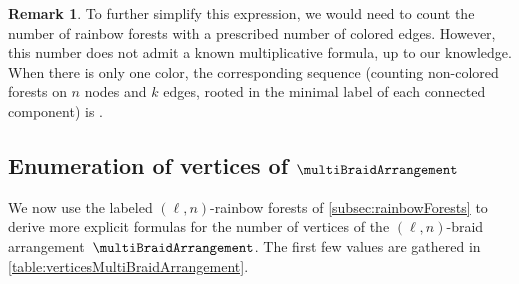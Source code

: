 \documentclass{amsart}
\theoremstyle{definition}
\newtheorem{remark}[theorem]{Remark}
\newcommand{\OEIS}[1]{\cite[{\rm \href{http://oeis.org/#1}{\texttt{#1}}}]{OEIS}}
\begin{document}
\begin{remark}
To further simplify this expression, we would need to count the number of rainbow forests with a prescribed number of colored edges.
However, this number does not admit a known multiplicative formula, up to our knowledge. When there is only one color, the corresponding sequence (counting non-colored forests on $n$ nodes and $k$ edges, rooted in the minimal label of each connected component) is \OEIS{A138464}.
\end{remark}


\subsection{Enumeration of vertices of $\multiBraidArrangement$}
\label{subsec:verticesMultiBraidArrangement}

We now use the labeled $(\ell,n)$-rainbow forests of \cref{subsec:rainbowForests} to derive more explicit formulas for the number of vertices of the $(\ell,n)$-braid arrangement~$\multiBraidArrangement$.
The first few values are gathered in \cref{table:verticesMultiBraidArrangement}.
 
\end{document}

